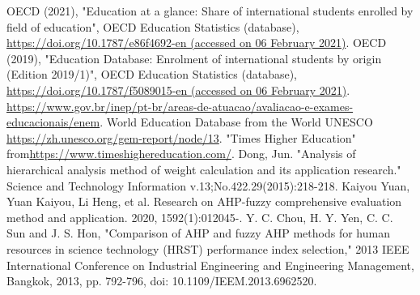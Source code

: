 \documentclass[12pt]{article}  %
\begin{document}
\begin{thebibliography}{99}
	 OECD (2021), "Education at a glance: Share of international students enrolled by field of education", OECD Education Statistics (database), \url{https://doi.org/10.1787/e86f4692-en (accessed on 06 February 2021)}.
	OECD (2019), "Education Database: Enrolment of international students by origin (Edition 2019/1)", OECD Education Statistics (database), \url{https://doi.org/10.1787/f5089015-en (accessed on 06 February 2021)}.
	\url{https://www.gov.br/inep/pt-br/areas-de-atuacao/avaliacao-e-exames-educacionais/enem}.
	World Education Database from the World UNESCO \url{https://zh.unesco.org/gem-report/node/13}.
	"Times Higher Education" from\url{https://www.timeshighereducation.com/}.
	Dong, Jun. "Analysis of hierarchical analysis method of weight calculation and its application research." Science and Technology Information v.13;No.422.29(2015):218-218.
	Kaiyou Yuan, Yuan Kaiyou, Li Heng, et al. Research on AHP-fuzzy comprehensive evaluation method and application. 2020, 1592(1):012045-.
	Y. C. Chou, H. Y. Yen, C. C. Sun and J. S. Hon, "Comparison of AHP and fuzzy AHP methods for human resources in science technology (HRST) performance index selection," 2013 IEEE International Conference on Industrial Engineering and Engineering Management, Bangkok, 2013, pp. 792-796, doi: 10.1109/IEEM.2013.6962520.
\end{thebibliography}
\end{document}
